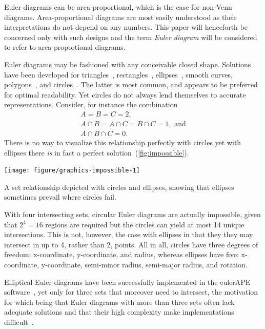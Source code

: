 \documentclass[a4paper,nofonts,nobib,titlepage,justified,marginals=raggedouter,nohyper]{tufte-handout}\usepackage[]{graphicx}\usepackage[]{color}
\newenvironment{knitrout}{}{} %
\newcommand{\pkg}[1]{{\fontseries{b}\selectfont #1}}
\begin{document}
Euler diagrams can be area-proportional, which is the case for non-Venn
diagrams. Area-proportional diagrams are most easily understood as their
interpretations do not depend on any numbers. This paper will henceforth be
concerned only with such designs and the term \emph{Euler diagram} will be
considered to refer to area-proportional diagrams.

Euler diagrams may be fashioned with any conceivable closed shape.
Solutions have been developed for triangles~\citep{swinton_2011},
rectangles~\citep{swinton_2011}, ellipses~\citep{micallef_2014},
smooth curves, polygons~\citep{swinton_2011}, and
circles~\citep{wilkinson_2012,kestler_2008,swinton_2011}. The latter is
most common, and appears to be preferred for optimal
readability. Yet circles do not always lend themselves to
accurate representations. Consider, for instance the combination
\[
\begin{gathered}
A = B = C = 2,\\
A \cap B = A \cap C = B \cap C = 1, \text{ and}\\
A \cap B \cap C = 0.
\end{gathered}
\]
There is no way to visualize this relationship perfectly with circles
yet with ellipses there \emph{is} in fact a perfect solution~(\cref{fig:impossible}).
\begin{marginfigure}
\begin{knitrout}
\color{fgcolor}

{\centering \texttt{[image: figure/graphics-impossible-1]} 

}



\end{knitrout}
\caption{A set relationship depicted with circles and ellipses, showing that ellipses sometimes prevail where circles fail.}
\label{fig:impossible}
\end{marginfigure}

With four intersecting sets, circular Euler diagrams are actually impossible,
given that $2^4=16$ regions are required but the circles can yield at most
14 unique intersections. This is not, however, the case with ellipses in that
they they may intersect in up to 4, rather than 2, points. All in all,
circles have three degrees of freedom: x-coordinate, y-coordinate, and
radius, whereas ellipses have five: x-coordinate, y-coordinate, semi-minor
radius, semi-major radius, and rotation.

Elliptical Euler diagrams have been successfully implemented in the
\pkg{eulerAPE} software~\citep{micallef_2014}, yet only for three sets that moreover
need to intersect, the motivation for which being that Euler diagrams
with more than three sets often lack adequate solutions and that their
high complexity make implementations difficult~\citep{micallef_2013}.
\end{document}
